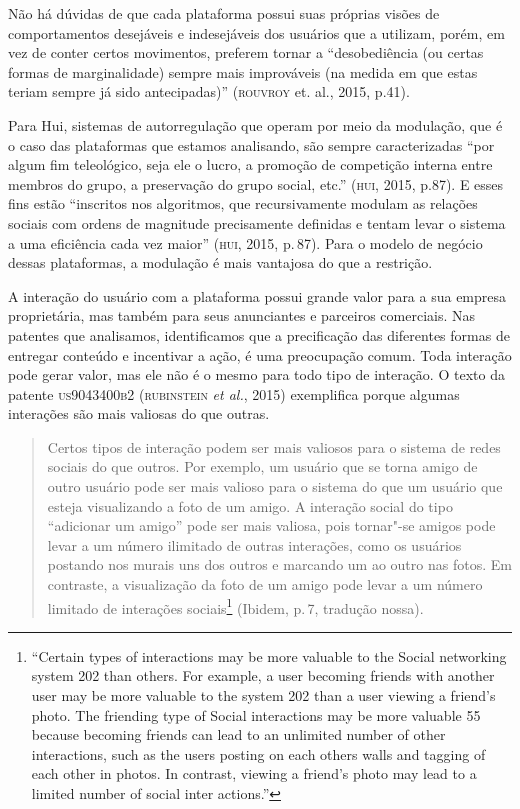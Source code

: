 Não há dúvidas de que cada plataforma possui suas próprias visões de
comportamentos desejáveis e indesejáveis dos usuários que a utilizam,
porém, em vez de conter certos movimentos, preferem tornar a
``desobediência (ou certas formas de marginalidade) sempre mais
improváveis (na medida em que estas teriam sempre já sido antecipadas)''
(\textsc{rouvroy} et. al., 2015, p.41).

Para Hui, sistemas de autorregulação que operam por meio da modulação,
que é o caso das plataformas que estamos analisando, são sempre
caracterizadas ``por algum fim teleológico, seja ele o lucro, a promoção
de competição interna entre membros do grupo, a preservação do grupo
social, etc.'' (\textsc{hui}, 2015, p.87). E esses fins estão ``inscritos nos
algoritmos, que recursivamente modulam as relações sociais com ordens de
magnitude precisamente definidas e tentam levar o sistema a uma
eficiência cada vez maior'' (\textsc{hui}, 2015, p.\,87). Para o modelo de negócio
dessas plataformas, a modulação é mais vantajosa do que a restrição.

A interação do usuário com a plataforma possui grande valor para a sua
empresa proprietária, mas também para seus anunciantes e parceiros
comerciais. Nas patentes que analisamos, identificamos que a
precificação das diferentes formas de entregar conteúdo e incentivar a
ação, é uma preocupação comum. Toda interação pode gerar valor, mas ele
não é o mesmo para todo tipo de interação. O texto da patente
\textsc{us9043400b2} (\textsc{rubinstein} \emph{et al.}, 2015) exemplifica porque algumas
interações são mais valiosas do que outras.

\begin{quote}
Certos tipos de interação podem ser mais valiosos para o sistema de
redes sociais do que outros. Por exemplo, um usuário que se torna amigo
de outro usuário pode ser mais valioso para o sistema do que um usuário
que esteja visualizando a foto de um amigo. A interação social do tipo
``adicionar um amigo'' pode ser mais valiosa, pois tornar"-se amigos pode
levar a um número ilimitado de outras interações, como os usuários
postando nos murais uns dos outros e marcando um ao outro nas fotos. Em
contraste, a visualização da foto de um amigo pode levar a um número
limitado de interações sociais\footnote{``Certain types of interactions
  may be more valuable to the Social networking system 202 than others.
  For example, a user becoming friends with another user may be more
  valuable to the system 202 than a user viewing a friend's photo. The
  friending type of Social interactions may be more valuable 55 because
  becoming friends can lead to an unlimited number of other
  interactions, such as the users posting on each others walls and
  tagging of each other in photos. In contrast, viewing a friend's photo
  may lead to a limited number of social inter actions.''} (Ibidem, p.\,7,
tradução nossa).
\end{quote}

